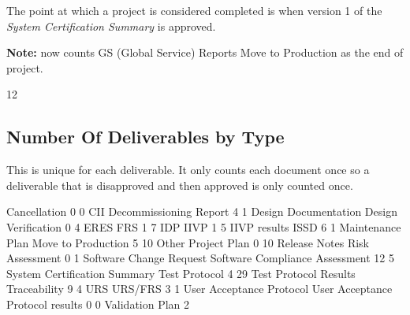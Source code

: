 \documentclass{article}
\begin{document}
The point at which a project is considered completed is when version 1 of the
\textit{System Certification Summary} is approved.

\textbf{Note:} now counts GS (Global Service) Reports Move to Production as the end
of project.

\begin{Schunk}
\begin{Soutput}
[1] 12
\end{Soutput}
\end{Schunk}


\subsection{Number Of Deliverables by Type}
This is unique for each deliverable. It only counts each document once so a deliverable
that is disapproved and then approved is only counted once.

\begin{Schunk}
\begin{Soutput}
                                                     Cancellation 
                               0                                0 
                             CII           Decommissioning Report 
                               4                                1 
            Design Documentation              Design Verification 
                               0                                4 
                            ERES                              FRS 
                               1                                7 
                             IDP                             IIVP 
                               1                                5 
                    IIVP results                             ISSD 
                               6                                1 
                Maintenance Plan               Move to Production 
                               5                               10 
                           Other                     Project Plan 
                               0                               10 
                   Release Notes                  Risk Assessment 
                               0                                1 
         Software Change Request   Software Compliance Assessment 
                              12                                5 
    System Certification Summary                    Test Protocol 
                               4                               29 
           Test Protocol Results                     Traceability 
                               9                                4 
                             URS                          URS/FRS 
                               3                                1 
        User Acceptance Protocol User Acceptance Protocol results 
                               0                                0 
                 Validation Plan 
                               2 
\end{Soutput}
\end{Schunk}
\end{document}
